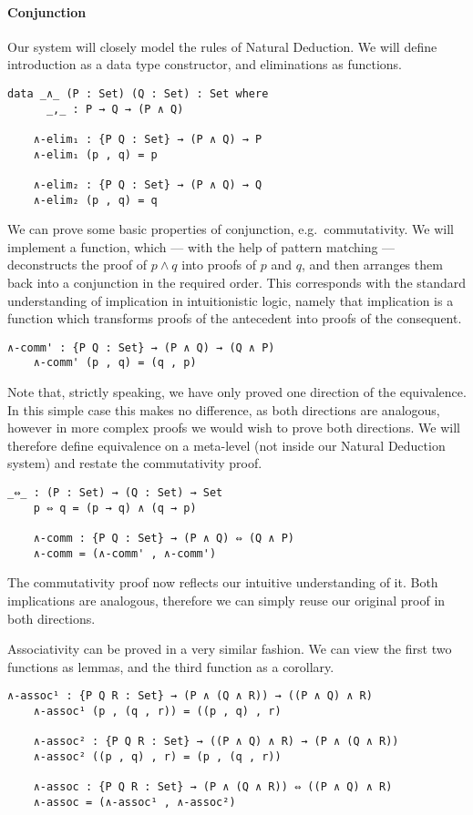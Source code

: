 \documentclass[12pt]{article}
\begin{document}
\paragraph{Conjunction}
Our system will closely model the rules of Natural Deduction. We will define introduction as a data type constructor, and eliminations as functions.
\begin{Verbatim}[samepage=true]
    data _∧_ (P : Set) (Q : Set) : Set where
      _,_ : P → Q → (P ∧ Q)

    ∧-elim₁ : {P Q : Set} → (P ∧ Q) → P
    ∧-elim₁ (p , q) = p

    ∧-elim₂ : {P Q : Set} → (P ∧ Q) → Q
    ∧-elim₂ (p , q) = q
\end{Verbatim}
We can prove some basic properties of conjunction, e.g.~commutativity. We will implement a function, which — with the help of pattern matching — deconstructs the proof of $p ∧ q$ into proofs of $p$ and $q$, and then arranges them back into a conjunction in the required order. This corresponds with the standard understanding of implication in intuitionistic logic, namely that implication is a function which transforms proofs of the antecedent into proofs of the consequent.
\begin{Verbatim}[samepage=true]
    ∧-comm' : {P Q : Set} → (P ∧ Q) → (Q ∧ P)
    ∧-comm' (p , q) = (q , p)
\end{Verbatim}
Note that, strictly speaking, we have only proved one direction of the equivalence. In this simple case this makes no difference, as both directions are analogous, however in more complex proofs we would wish to prove both directions. We will therefore define equivalence on a meta-level (not inside our Natural Deduction system) and restate the commutativity proof.
\begin{Verbatim}[samepage=true]
    _⇔_ : (P : Set) → (Q : Set) → Set
    p ⇔ q = (p → q) ∧ (q → p)

    ∧-comm : {P Q : Set} → (P ∧ Q) ⇔ (Q ∧ P)
    ∧-comm = (∧-comm' , ∧-comm')
\end{Verbatim}
The commutativity proof now reflects our intuitive understanding of it. Both implications are analogous, therefore we can simply reuse our original proof in both directions.

Associativity can be proved in a very similar fashion. We can view the first two functions as lemmas, and the third function as a corollary.
\begin{Verbatim}[samepage=true]
    ∧-assoc¹ : {P Q R : Set} → (P ∧ (Q ∧ R)) → ((P ∧ Q) ∧ R)
    ∧-assoc¹ (p , (q , r)) = ((p , q) , r)

    ∧-assoc² : {P Q R : Set} → ((P ∧ Q) ∧ R) → (P ∧ (Q ∧ R))
    ∧-assoc² ((p , q) , r) = (p , (q , r))

    ∧-assoc : {P Q R : Set} → (P ∧ (Q ∧ R)) ⇔ ((P ∧ Q) ∧ R)
    ∧-assoc = (∧-assoc¹ , ∧-assoc²)
\end{Verbatim}
\end{document}

